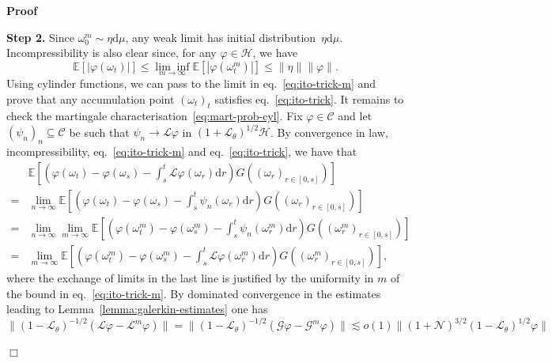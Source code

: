 \documentclass[10pt]{article}
\newcommand{\mathd}{\mathrm{d}}
\newcommand{\tmtextbf}[1]{{\bfseries{#1}}}
\newenvironment{proof}{\noindent\textbf{Proof\ }}{\hspace*{\fill}$\Box$\medskip}
\begin{document}
\begin{proof}
  \
  
  \tmtextbf{Step 2.} Since $\omega_0^m \sim \eta \mathd \mu$, any weak limit
  has initial distribution~$\eta \mathd \mu$. Incompressibility is also clear
  since, for any $\varphi \in \mathcal{H}$, we have
  \[ \mathbb{E} [| \varphi (\omega_t) |] \leqslant \underset{m \rightarrow
     \infty}{\lim \inf} \mathbb{E} [| \varphi (\omega_t^m) |] \leqslant \|
     \eta \| \| \varphi \| . \]
  Using cylinder functions, we can pass to the limit in
  eq.~{\eqref{eq:ito-trick-m}} and prove that any accumulation point
  $(\omega_t)_t$ satisfies eq.~{\eqref{eq:ito-trick}}. It remains to check the
  martingale characterisation~{\eqref{eq:mart-prob-cyl}}. Fix $\varphi \in
  \mathcal{C}$ and let $(\psi_n)_n \subseteq \mathcal{C}$ be such that $\psi_n
  \rightarrow \mathcal{L} \varphi$ in $(1 +\mathcal{L}_{\theta})^{1 / 2}
  \mathcal{H}$. By convergence in law, incompressibility,
  eq.~{\eqref{eq:ito-trick-m}} and eq.~{\eqref{eq:ito-trick}}, we have that
  \[ \begin{array}{ll}
       & \mathbb{E} \left[ \left( \varphi (\omega_t) - \varphi (\omega_s) -
       \int_s^t \mathcal{L} \varphi (\omega_r) \mathd r \right) G
       ((\omega_r)_{r \in [0, s]}) \right]\\
       = & \lim_{n \rightarrow \infty} \mathbb{E} \left[ \left( \varphi
       (\omega_t) - \varphi (\omega_s) - \int_s^t \psi_n (\omega_r) \mathd r
       \right) G ((\omega_r)_{r \in [0, s]}) \right]\\
       = & \lim_{n \rightarrow \infty} \lim_{m \rightarrow \infty} \mathbb{E}
       \left[ \left( \varphi (\omega_t^m) - \varphi (\omega_s^m) - \int_s^t
       \psi_n (\omega_r^m) \mathd r \right) G ((\omega_r^m)_{r \in [0, s]})
       \right]\\
       = & \lim_{m \rightarrow \infty} \mathbb{E} \left[ \left( \varphi
       (\omega_t^m) - \varphi (\omega_s^m) - \int_s^t \mathcal{L} \varphi
       (\omega_r^m) \mathd r \right) G ((\omega_r^m)_{r \in [0, s]}) \right],
     \end{array} \]
  where the exchange of limits in the last line is justified by the uniformity
  in $m$ of the bound in eq.~{\eqref{eq:ito-trick-m}}. By dominated
  convergence in the estimates leading to Lemma~\ref{lemma:galerkin-estimates}
  one has
  \[ \| (1 -\mathcal{L}_{\theta})^{- 1 / 2} (\mathcal{L} \varphi
     -\mathcal{L}^m \varphi) \| = \| (1 -\mathcal{L}_{\theta})^{- 1 / 2}
     (\mathcal{G} \varphi -\mathcal{G}^m \varphi) \| \lesssim o (1) \| (1
     +\mathcal{N})^{3 / 2} (1 -\mathcal{L}_{\theta})^{1 / 2} \varphi \| \]

\end{proof}
\end{document}
